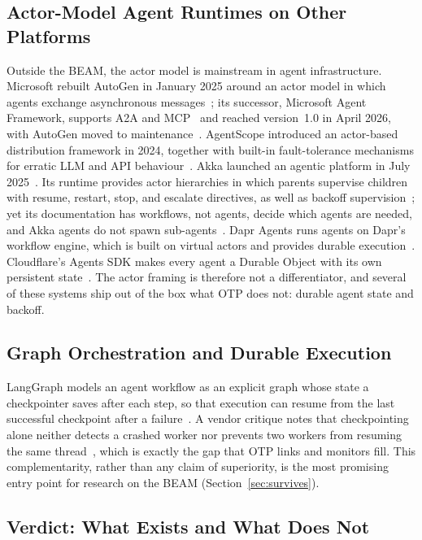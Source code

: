 \documentclass[conference,letterpaper]{IEEEtran}
\begin{document}
\subsection{Actor-Model Agent Runtimes on Other Platforms}

Outside the BEAM, the actor model is mainstream in agent infrastructure.
Microsoft rebuilt AutoGen in January 2025 around an actor model in which
agents exchange asynchronous messages~\cite{autogen2025}; its successor,
Microsoft Agent Framework, supports A2A and MCP~\cite{maf-sdtimes} and
reached version~1.0 in April 2026, with AutoGen moved to
maintenance~\cite{maf-vsm}. AgentScope introduced an actor-based
distribution framework in 2024, together with built-in fault-tolerance
mechanisms for erratic LLM and API behaviour~\cite{gao2024}. Akka launched
an agentic platform in July 2025~\cite{akka2025}. Its runtime provides actor
hierarchies in which parents supervise children with resume, restart, stop,
and escalate directives, as well as backoff
supervision~\cite{akka-capabilities}; yet its documentation has workflows,
not agents, decide which agents are needed, and Akka agents do not spawn
sub-agents~\cite{akka-patterns}. Dapr Agents runs agents on Dapr's workflow
engine, which is built on virtual actors and provides durable
execution~\cite{dapr-agents,dapr-docs}. Cloudflare's Agents SDK makes every
agent a Durable Object with its own persistent
state~\cite{cloudflare-agents}. The actor framing is therefore not a
differentiator, and several of these systems ship out of the box what OTP
does not: durable agent state and backoff.

\subsection{Graph Orchestration and Durable Execution}

LangGraph models an agent workflow as an explicit graph whose state a
checkpointer saves after each step, so that execution can resume from the
last successful checkpoint after a failure~\cite{langgraph-durable}. A
vendor critique notes that checkpointing alone neither detects a crashed
worker nor prevents two workers from resuming the same
thread~\cite{diagrid2025}, which is exactly the gap that OTP links and
monitors fill. This complementarity, rather than any claim of superiority,
is the most promising entry point for research on the BEAM
(Section~\ref{sec:survives}).

\subsection{Verdict: What Exists and What Does Not}\label{sec:gaps}
\end{document}
